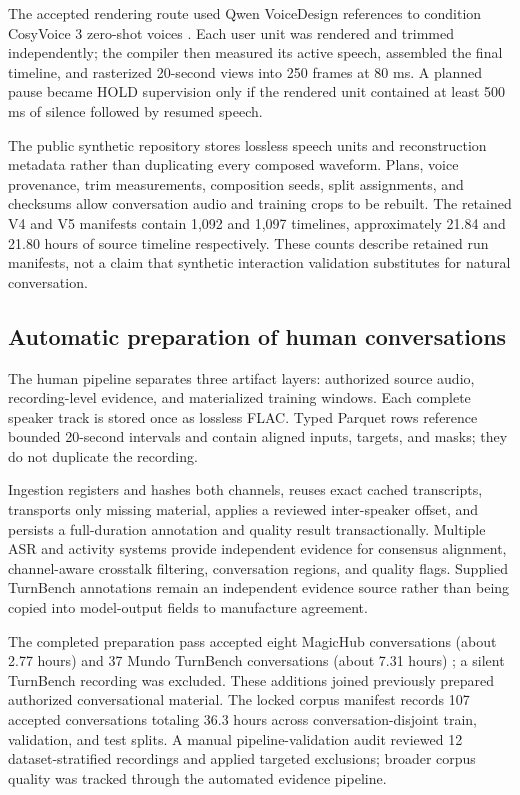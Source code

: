 \documentclass[10pt,twocolumn]{article}
\begin{document}
The accepted rendering route used Qwen VoiceDesign references to condition CosyVoice 3 zero-shot
voices \cite{qwentts,cosyvoice}. Each user unit was rendered and trimmed independently;
the compiler then measured its active speech, assembled the final timeline, and rasterized
20-second views into 250 frames at 80 ms. A planned pause became HOLD supervision only if the
rendered unit contained at least 500 ms of silence followed by resumed speech.

The public synthetic repository \cite{turndata} stores lossless speech units and reconstruction metadata rather
than duplicating every composed waveform. Plans, voice provenance, trim measurements, composition
seeds, split assignments, and checksums allow conversation audio and training crops to be rebuilt.
The retained V4 and V5 manifests contain 1,092 and 1,097 timelines, approximately 21.84 and 21.80
hours of source timeline respectively. These counts describe retained run manifests, not a claim
that synthetic interaction validation substitutes for natural conversation.

\subsection{Automatic preparation of human conversations}

The human pipeline separates three artifact layers: authorized source audio, recording-level
evidence, and materialized training windows. Each complete speaker track is stored once as lossless
FLAC. Typed Parquet rows reference bounded 20-second intervals and contain aligned inputs, targets,
and masks; they do not duplicate the recording.

Ingestion registers and hashes both channels, reuses exact cached transcripts, transports only
missing material, applies a reviewed inter-speaker offset, and persists a full-duration annotation
and quality result transactionally. Multiple ASR and activity systems provide independent evidence
for consensus alignment, channel-aware crosstalk filtering, conversation regions, and quality
flags. Supplied TurnBench annotations remain an independent evidence source rather than being
copied into model-output fields to manufacture agreement.

The completed preparation pass accepted eight MagicHub conversations (about 2.77 hours)
\cite{magichub} and 37 Mundo TurnBench conversations (about 7.31 hours) \cite{turnbench}; a silent
TurnBench recording was excluded.
These additions joined previously prepared authorized conversational material. The locked corpus
manifest records 107 accepted conversations totaling 36.3 hours across conversation-disjoint train,
validation, and test splits. A manual pipeline-validation audit reviewed 12 dataset-stratified recordings and
applied targeted exclusions; broader corpus quality was tracked through the automated evidence pipeline.
\end{document}

